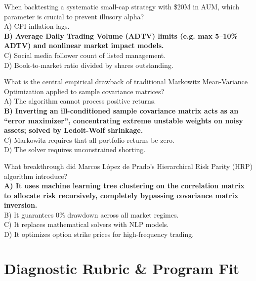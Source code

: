 \documentclass[11pt,a4paper]{article}
\begin{document}
\begin{infobox}
When backtesting a systematic small-cap strategy with \$20M in AUM, which parameter is crucial to prevent illusory alpha?\\
A) CPI inflation lags.\\
\textbf{B) Average Daily Trading Volume (ADTV) limits (e.g. max 5--10\% ADTV) and nonlinear market impact models.}\\
C) Social media follower count of listed management.\\
D) Book-to-market ratio divided by shares outstanding.
\end{infobox}

\begin{infobox}
What is the central empirical drawback of traditional Markowitz Mean-Variance Optimization applied to sample covariance matrices?\\
A) The algorithm cannot process positive returns.\\
\textbf{B) Inverting an ill-conditioned sample covariance matrix acts as an ``error maximizer'', concentrating extreme unstable weights on noisy assets; solved by Ledoit-Wolf shrinkage.}\\
C) Markowitz requires that all portfolio returns be zero.\\
D) The solver requires unconstrained shorting.
\end{infobox}

\begin{infobox}
What breakthrough did Marcos L\'opez de Prado's Hierarchical Risk Parity (HRP) algorithm introduce?\\
\textbf{A) It uses machine learning tree clustering on the correlation matrix to allocate risk recursively, completely bypassing covariance matrix inversion.}\\
B) It guarantees 0\% drawdown across all market regimes.\\
C) It replaces mathematical solvers with NLP models.\\
D) It optimizes option strike prices for high-frequency trading.
\end{infobox}

\vspace{10pt}

\section{Diagnostic Rubric \& Program Fit}
\end{document}
